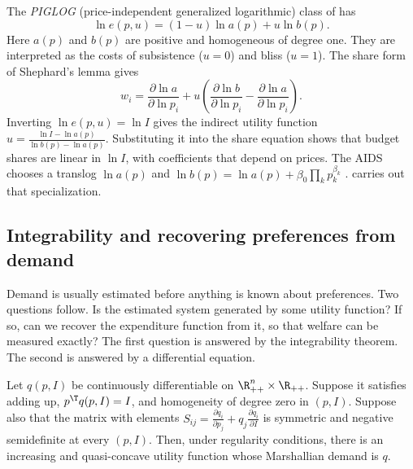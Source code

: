 \begin{example}\label{ex:B-piglog}
The \emph{PIGLOG} (price-independent generalized logarithmic) class of
\citet[eq.~1, p.~313]{DeatonMuellbauer1980a} has
\begin{equation*}
\ln e(p, u) = (1 - u)\ln a(p) + u\ln b(p).
\end{equation*}
Here $a(p)$ and $b(p)$ are positive and homogeneous of degree one. They are interpreted as the costs of
subsistence ($u = 0$) and bliss ($u = 1$). The share form of Shephard's lemma gives
\begin{equation*}
w_i = \frac{\partial\ln a}{\partial\ln p_i} + u\left(\frac{\partial\ln b}{\partial\ln p_i} - \frac{\partial\ln a}{\partial\ln p_i}\right).
\end{equation*}
Inverting $\ln e(p, u) = \ln I$ gives the indirect utility function
$u = \frac{\ln I - \ln a(p)}{\ln b(p) - \ln a(p)}$. Substituting it into the share equation shows that budget
shares are linear in $\ln I$, with coefficients that depend on prices. The AIDS chooses a translog
$\ln a(p)$ and $\ln b(p) = \ln a(p) + \beta_0\prod_kp_k^{\beta_k}$ \citep[eqs.~2--4]{DeatonMuellbauer1980a}.
 carries out that specialization.
\end{example}

\subsection{Integrability and recovering preferences from demand}\label{sec:B-integrability}

Demand is usually estimated before anything is known about preferences. Two questions follow. Is the
estimated system generated by some utility function? If so, can we recover the expenditure function from
it, so that welfare can be measured exactly? The first question is answered by the integrability theorem.
The second is answered by a differential equation.

\begin{proposition}\label{prop:B-integrability}
Let $q(p, I)$ be continuously differentiable on $\R^n_{++} \times \R_{++}$. Suppose it satisfies adding up,
$p^\T q(p, I) = I$, and homogeneity of degree zero in $(p, I)$. Suppose also that the matrix with elements
$S_{ij} = \frac{\partial q_i}{\partial p_j} + q_j\frac{\partial q_i}{\partial I}$ is symmetric and negative
semidefinite at every $(p, I)$. Then, under regularity conditions, there is an increasing and
quasi-concave utility function whose Marshallian demand is $q$.
\end{proposition}

